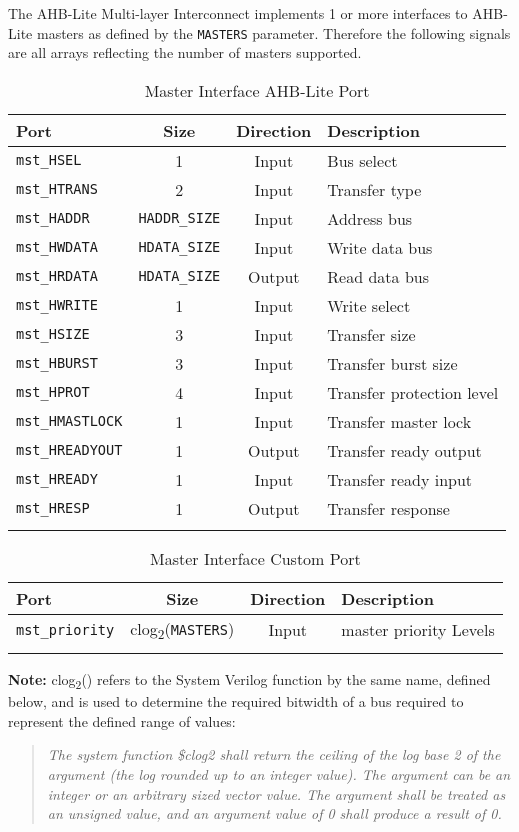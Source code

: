 The AHB-Lite Multi-layer Interconnect implements 1 or more interfaces to AHB-Lite masters
as defined by the \texttt{MASTERS} parameter. Therefore the following signals are all
arrays reflecting the number of masters supported.

\begin{longtable}[]{@{}lccl@{}}
\toprule
Port & Size & Direction & Description\tabularnewline
\midrule
\endhead
\texttt{mst\_HSEL}      & 1                     & Input  & Bus select\tabularnewline
\texttt{mst\_HTRANS}    & 2                     & Input  & Transfer type\tabularnewline
\texttt{mst\_HADDR}     & \texttt{HADDR\_SIZE}  & Input  & Address bus\tabularnewline
\texttt{mst\_HWDATA}    & \texttt{HDATA\_SIZE}  & Input  & Write data bus\tabularnewline
\texttt{mst\_HRDATA}    & \texttt{HDATA\_SIZE}  & Output & Read data bus\tabularnewline
\texttt{mst\_HWRITE}    & 1                     & Input  & Write select\tabularnewline
\texttt{mst\_HSIZE}     & 3                     & Input  & Transfer size\tabularnewline
\texttt{mst\_HBURST}    & 3                     & Input  & Transfer burst size\tabularnewline
\texttt{mst\_HPROT}     & 4                     & Input  & Transfer protection level\tabularnewline
\texttt{mst\_HMASTLOCK} & 1                     & Input  & Transfer master lock\tabularnewline
\texttt{mst\_HREADYOUT} & 1                     & Output & Transfer ready output\tabularnewline
\texttt{mst\_HREADY}    & 1                     & Input  & Transfer ready input\tabularnewline
\texttt{mst\_HRESP}     & 1                     & Output & Transfer response\tabularnewline
\bottomrule
\caption{Master Interface AHB-Lite Port}
\end{longtable}

\begin{longtable}[]{@{}lccl@{}}
\toprule
Port & Size & Direction & Description\tabularnewline
\midrule
\endhead
\texttt{mst\_priority}  & clog\textsubscript{2}(\texttt{MASTERS}) & Input & master priority Levels\tabularnewline
\bottomrule
\caption{Master Interface Custom Port}
\end{longtable}

\textbf{Note:} clog\textsubscript{2}() refers to the System Verilog function by
the same name, defined below, and is used to determine the required bitwidth of a
bus required to represent the defined range of values:

\begin{quote}
\emph{The system function \$clog2 shall return the ceiling of the log
base 2 of the argument (the log rounded up to an integer value). The
argument can be an integer or an arbitrary sized vector value. The
argument shall be treated as an unsigned value, and an argument value of
0 shall produce a result of 0.}
\end{quote}

